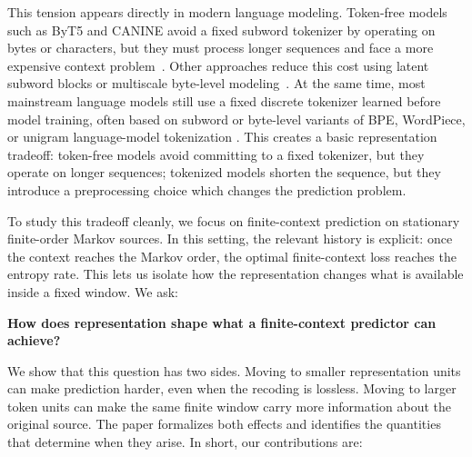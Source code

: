 \documentclass{article}
\theoremstyle{plain}
\theoremstyle{definition}
\theoremstyle{remark}
\begin{document}
    
    This tension appears directly in modern language modeling. Token-free models
    such as ByT5 and CANINE avoid a fixed subword tokenizer by operating on bytes or
    characters, but they must process longer sequences and face a more expensive
    context problem~\citep{xueByT5TokenFreeFuture2022,
    clarkCaninePretrainingEfficient2022}. Other approaches reduce this cost using
    latent subword blocks or multiscale byte-level modeling~\citep{
    tayCharformerFastCharacter2021,yuMEGABYTEPredictingMillionbyte2023}. At the
    same time, most mainstream language models still use a fixed discrete tokenizer
    learned before model training, often based on subword or byte-level variants of
    BPE, WordPiece, or unigram language-model tokenization
    \citep{sennrichNeuralMachineTranslation2016,
    schusterJapaneseKoreanVoice2012,devlinBERTPretrainingDeep2019, kudoSentencePieceSimpleLanguage2018a}. This creates a basic representation tradeoff: token-free models avoid committing
    to a fixed tokenizer, but they operate on longer sequences; tokenized models
    shorten the sequence, but they introduce a preprocessing choice which changes the prediction problem.
    
    To study this tradeoff cleanly, we focus on finite-context prediction on
    stationary finite-order Markov sources. In this setting, the relevant history is
    explicit: once the context reaches the Markov order, the optimal finite-context
    loss reaches the entropy rate. This lets us isolate how the representation
    changes what is available inside a fixed window. We ask:
    
    
    \begin{center}
    \textbf{How does representation shape what a finite-context predictor can achieve?}
    \end{center}
    
    We show that this question has two sides. Moving to smaller representation units
    can make prediction harder, even when the recoding is lossless. Moving to larger
    token units can make the same finite window carry more information about the
    original source. The paper formalizes both effects and identifies the quantities
    that determine when they arise. In short, our contributions are:
    
\end{document}
